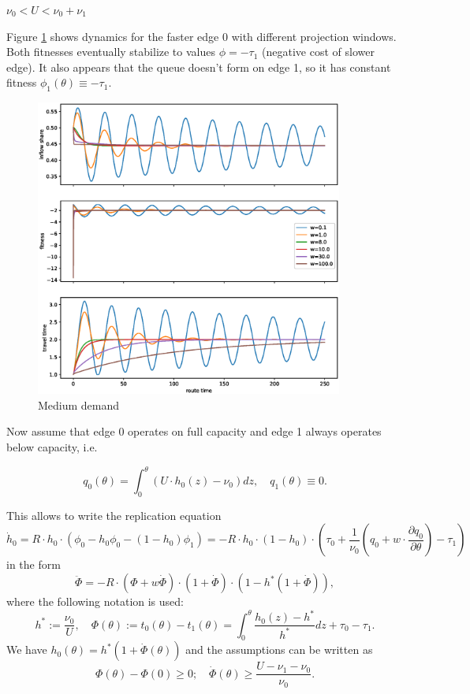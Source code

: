 \documentclass[12pt]{article}
\begin{document}
$ \nu_0 < U < \nu_0 + \nu_1$

Figure \ref{fig:replicator_medium_demand} shows dynamics for the faster edge 0 with different projection windows. 
Both fitnesses eventually stabilize to values $\phi = -\tau_1$ (negative cost of slower edge).
It also appears that the queue doesn't form on edge 1, so it has constant fitness $\phi_1(\theta) \equiv - \tau_1 $.

\begin{figure}
	\includegraphics[width=0.9\textwidth]{img/replicator_medium_demand.eps}
	\caption{ Medium demand }
	\label{fig:replicator_medium_demand}

\end{figure}

Now assume that edge 0 operates on full capacity and  edge 1 always operates below capacity, i.e.

$$q_0(\theta) = \int_0^\theta (U\cdot h_0(z) - \nu_0) dz, \quad
 q_1(\theta) \equiv 0 .$$

This  allows to write the replication equation
$$ \dot{h}_0 = R \cdot h_0 \cdot (\phi_0 - h_0\phi_0 - (1-h_0)\phi_1) = -R \cdot h_0 \cdot ( 1- h_0 ) \cdot \left( \tau_0 + \frac{1}{\nu_0} (q_0 + w \cdot \frac{\partial q_0}{\partial \theta}) - \tau_1 \right) $$
in the form
$$ \ddot{\Phi} = - R \cdot (\Phi + w \dot{\Phi}) \cdot  (1+ \dot{\Phi}) \cdot (1 -  h^* (1+ \dot{\Phi})),$$
 where the following notation is used: 
 $$h^* := \frac{\nu_0}{U}, \quad \Phi(\theta) := t_0(\theta) - t_1(\theta) = \int_0^{\theta} \frac{h_0(z) - h^*}{h^*} dz + \tau_0  - \tau_1 .$$
  We have $ h_0(\theta) = h^* (1 + \dot{\Phi}(\theta))$ and the assumptions can be written as 
 $$\Phi(\theta) - \Phi(0) \geq 0; \quad \dot{\Phi}(\theta) \geq \frac{U - \nu_1 - \nu_0}{\nu_0} .$$
\end{document}
